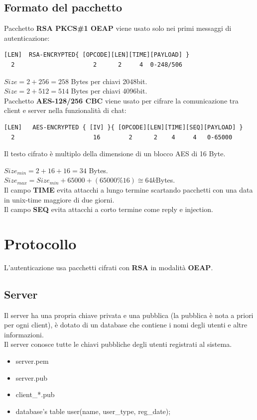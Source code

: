 \documentclass[a4paper,titlepage]{article}
\begin{document}
\subsection{Formato del pacchetto}

Pacchetto \textbf{RSA PKCS\#1 OEAP} viene usato solo nei primi messaggi di autenticazione:
{\color{red} \begin{verbatim}
[LEN]  RSA-ENCRYPTED{ [OPCODE][LEN][TIME][PAYLOAD] }
  2                      2      2     4  0-248/506
\end{verbatim}}
$Size = 2 + 256= 258$ Bytes per chiavi 2048bit.\\
$Size = 2 + 512= 514$ Bytes per chiavi 4096bit.\\

Pacchetto \textbf{AES-128/256 CBC} viene usato per cifrare la comunicazione tra client e server nella funzionalità di chat:
{\color{red} \begin{verbatim}
[LEN]   AES-ENCRYPTED { [IV] }{ [OPCODE][LEN][TIME][SEQ][PAYLOAD] }
  2                      16        2      2    4     4   0-65000
\end{verbatim} }
Il testo cifrato è multiplo della dimensione di un blocco AES di 16 Byte.

$Size_{min} = 2 + 16 + 16 = 34$ Bytes.\\
$Size_{max} = Size_{min} + 65000 + ( 65000 \% 16 ) \cong 64k$Bytes.\\

Il campo \textbf{TIME} evita attacchi a lungo termine scartando pacchetti con una data in unix-time maggiore di due giorni.\\
Il campo \textbf{SEQ} evita attacchi a corto termine come reply e injection.
\section{Protocollo}
L'autenticazione usa pacchetti cifrati con \textbf{RSA} in modalità \textbf{OEAP}.
\subsection{Server}
Il server ha una propria chiave privata e una pubblica (la pubblica è nota a priori per ogni client), è dotato di un database che contiene i nomi degli utenti e altre informazioni.\\
Il server conosce tutte le chiavi pubbliche degli utenti registrati al sistema.
\begin{itemize}
\item server.pem
\item server.pub
\item client\_*.pub
\item database's table user(name, user\_type, reg\_date);
\end{itemize}
\end{document}
